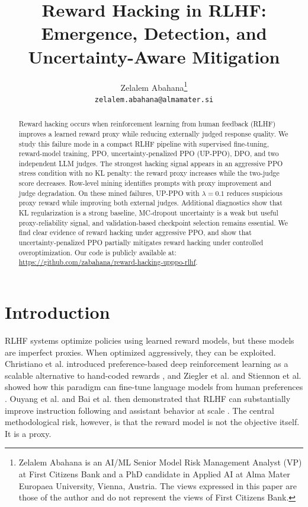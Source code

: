 \documentclass[11pt]{article}
\title{Reward Hacking in RLHF:\\Emergence, Detection, and Uncertainty-Aware Mitigation}
\author{Zelalem Abahana\thanks{Zelalem Abahana is an AI/ML Senior Model Risk Management Analyst (VP) at First Citizens Bank and a PhD candidate in Applied AI at Alma Mater Europaea University, Vienna, Austria. The views expressed in this paper are those of the author and do not represent the views of First Citizens Bank.}\\\texttt{zelalem.abahana@almamater.si}}
\begin{document}
\maketitle
\thispagestyle{plain}
\pagestyle{plain}
\begin{abstract}
Reward hacking occurs when reinforcement learning from human feedback (RLHF) improves a learned reward proxy while reducing externally judged response quality. We study this failure mode in a compact RLHF pipeline with supervised fine-tuning, reward-model training, PPO, uncertainty-penalized PPO (UP-PPO), DPO, and two independent LLM judges. The strongest hacking signal appears in an aggressive PPO stress condition with no KL penalty: the reward proxy increases while the two-judge score decreases. Row-level mining identifies prompts with proxy improvement and judge degradation. On these mined failures, UP-PPO with $\lambda=0.1$ reduces suspicious proxy reward while improving both external judges. Additional diagnostics show that KL regularization is a strong baseline, MC-dropout uncertainty is a weak but useful proxy-reliability signal, and validation-based checkpoint selection remains essential. We find clear evidence of reward hacking under aggressive PPO, and show that uncertainty-penalized PPO partially mitigates reward hacking under controlled overoptimization. Our code is publicly available at: \url{https://github.com/zabahana/reward-hacking-upppo-rlhf}.
\end{abstract}
\par\smallskip{}\par\vspace{0.75em}



\section{Introduction}
RLHF systems optimize policies using learned reward models, but these models are imperfect proxies. When optimized aggressively, they can be exploited. Christiano et al. introduced preference-based deep reinforcement learning as a scalable alternative to hand-coded rewards \cite{christiano2017deep}, and Ziegler et al. and Stiennon et al. showed how this paradigm can fine-tune language models from human preferences \cite{ziegler2019fine,stiennon2020learning}. Ouyang et al. and Bai et al. then demonstrated that RLHF can substantially improve instruction following and assistant behavior at scale \cite{ouyang2022training,bai2022training}. The central methodological risk, however, is that the reward model is not the objective itself. It is a proxy.
\end{document}
